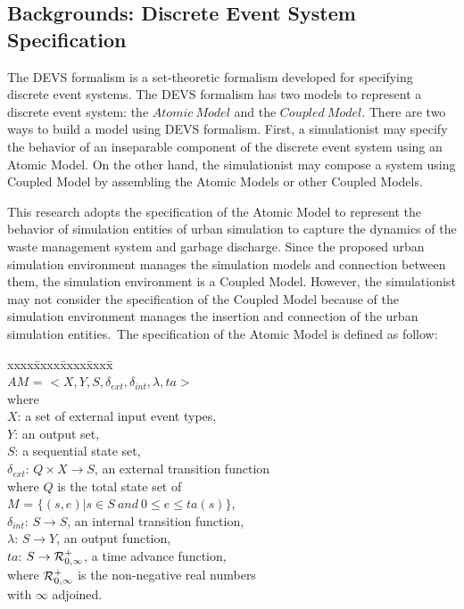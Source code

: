 \documentclass{scsSimAUDPaperFormat}
\begin{document}
\subsection{Backgrounds: Discrete Event System Specification}
The DEVS formalism is a set-theoretic formalism developed for specifying discrete event systems. The DEVS formalism has two models to represent a discrete event system: the $Atomic~Model$ and the $Coupled~Model$.
There are two ways to build a model using DEVS formalism. First, a simulationist may specify the behavior of an inseparable component of the discrete event system using an Atomic Model. On the other hand, the simulationist may compose a system using Coupled Model by assembling the Atomic Models or other Coupled Models. 

This research adopts the specification of the Atomic Model to represent the behavior of simulation entities of urban simulation to capture the dynamics of the waste management system and garbage discharge.
Since the proposed urban simulation environment manages the simulation models and connection between them, the simulation environment is a Coupled Model. However, the simulationist may not consider the specification of the Coupled Model because of the simulation environment manages the insertion and connection of the urban simulation entities.~The specification of the Atomic Model is defined as follow:

\begin{tabbing}
xxxx\=xxxx\=xxxx\=xxxx\=\kill\\
\> \> \> $AM$ = $<X, Y, S, \delta_{ext}, \delta_{int}, \lambda, ta>$\\
where\\
\> $X$: a set of external input event types,\\
\> $Y$: an output set,\\
\> $S$: a sequential state set,\\
\> $\delta_{ext}$: $Q \times X \rightarrow S$, an external transition function\\
\> \> where $Q$ is the total state set of \\
\> \> $M$ = $\{(s,e)|s \in S\:and\:0 \leq e \leq ta(s)\}$,\\
\> $\delta_{int}$: $S \rightarrow S$, an internal transition function,\\
\> $\lambda$: $S \rightarrow Y$, an output function,\\
\> $ta$: $S \rightarrow {\cal R}^{+}_{0,\infty}$, a time advance function, \\
\> \> where ${\cal R}^{+}_{0,\infty}$ is the non-negative real numbers \\
\> \> with $\infty$ adjoined.
\end{tabbing}
\end{document}
